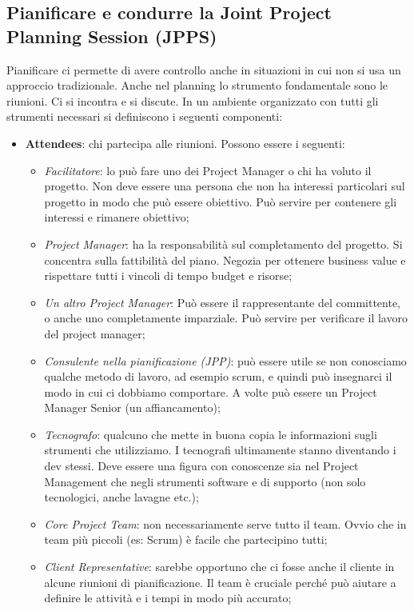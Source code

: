 \subsection{Pianificare e condurre la Joint Project Planning Session (JPPS)}
Pianificare ci permette di avere controllo anche in situazioni in cui non si usa un approccio tradizionale. Anche nel planning lo strumento fondamentale sono le riunioni. Ci si incontra e si discute. In un ambiente organizzato con tutti gli strumenti necessari si definiscono i seguenti componenti:
\begin{itemize}
	\item \textbf{Attendees}: chi partecipa alle riunioni. Possono essere i seguenti:
	\begin{itemize}
		\item \textit{Facilitatore}: lo può fare uno dei Project Manager o chi ha voluto il progetto. Non deve essere una persona che non ha interessi particolari sul progetto in modo che può essere obiettivo. Può servire per contenere gli interessi e rimanere obiettivo;
		\item \textit{Project Manager}: ha la responsabilità sul completamento del progetto. Si concentra sulla fattibilità del piano. Negozia per ottenere business value e rispettare tutti i vincoli di tempo budget e risorse;
		\item \textit{Un altro Project Manager}: Può essere il rappresentante del committente, o anche uno completamente imparziale. Può servire per verificare il lavoro del project manager;
		\item \textit{Consulente nella pianificazione (JPP)}: può essere utile se non conosciamo qualche metodo di lavoro, ad esempio scrum, e quindi può insegnarci il modo in cui ci dobbiamo comportare. A volte può essere un Project Manager Senior (un affiancamento);
		\item \textit{Tecnografo}: qualcuno che mette in buona copia le informazioni sugli strumenti che utilizziamo. I tecnografi ultimamente stanno diventando i dev stessi. Deve essere una figura con conoscenze sia nel Project Management che negli strumenti software e di supporto (non solo tecnologici, anche lavagne etc.);
		\item \textit{Core Project Team}: non necessariamente serve tutto il team. Ovvio che in team più piccoli (es: Scrum) è facile che partecipino tutti;
		\item \textit{Client Representative}: sarebbe opportuno che ci fosse anche il cliente in alcune riunioni di pianificazione. Il team è cruciale perché può aiutare a definire le attività e i tempi in modo più accurato;

\end{itemize}
\end{itemize}
